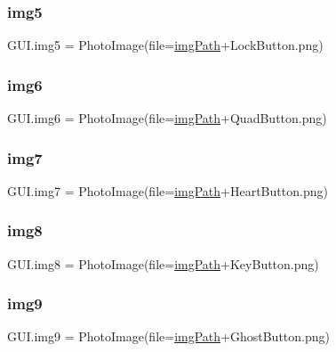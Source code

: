 \subsubsection{\texorpdfstring{img5}{img5}}
{\footnotesize\ttfamily G\+U\+I.\+img5 = Photo\+Image(file=\mbox{\hyperlink{namespace_g_u_i_a293e22c0a27a45862ad50fcb8ed12f15}{img\+Path}}+\textquotesingle{}Lock\+Button.\+png\textquotesingle{})}

\mbox{\label{namespace_g_u_i_a6cb0dc882c4030753831044192cbef73}} 
\subsubsection{\texorpdfstring{img6}{img6}}
{\footnotesize\ttfamily G\+U\+I.\+img6 = Photo\+Image(file=\mbox{\hyperlink{namespace_g_u_i_a293e22c0a27a45862ad50fcb8ed12f15}{img\+Path}}+\textquotesingle{}Quad\+Button.\+png\textquotesingle{})}

\mbox{\label{namespace_g_u_i_ab8b458d392f9b3d983f3d09b8eadf226}} 
\subsubsection{\texorpdfstring{img7}{img7}}
{\footnotesize\ttfamily G\+U\+I.\+img7 = Photo\+Image(file=\mbox{\hyperlink{namespace_g_u_i_a293e22c0a27a45862ad50fcb8ed12f15}{img\+Path}}+\textquotesingle{}Heart\+Button.\+png\textquotesingle{})}

\mbox{\label{namespace_g_u_i_a16cb8d3ad11106b26025ddbf102b8a6f}} 
\subsubsection{\texorpdfstring{img8}{img8}}
{\footnotesize\ttfamily G\+U\+I.\+img8 = Photo\+Image(file=\mbox{\hyperlink{namespace_g_u_i_a293e22c0a27a45862ad50fcb8ed12f15}{img\+Path}}+\textquotesingle{}Key\+Button.\+png\textquotesingle{})}

\mbox{\label{namespace_g_u_i_a6ece4b78fbb7ed63258caf1a781471f4}} 
\subsubsection{\texorpdfstring{img9}{img9}}
{\footnotesize\ttfamily G\+U\+I.\+img9 = Photo\+Image(file=\mbox{\hyperlink{namespace_g_u_i_a293e22c0a27a45862ad50fcb8ed12f15}{img\+Path}}+\textquotesingle{}Ghost\+Button.\+png\textquotesingle{})}

